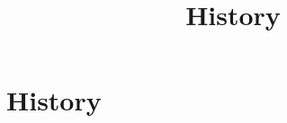 \documentclass[../../OAE-SPEC-MAIN.tex]{subfiles}
\title{History}
\begin{document}
\chapter{History}\label{sec:history}






\end{document}
